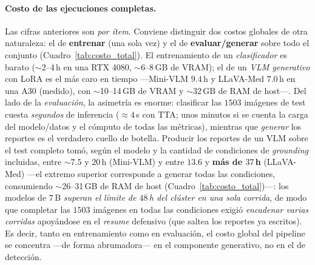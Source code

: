 \documentclass[11pt, a4paper]{article}
\begin{document}
\paragraph{Costo de las ejecuciones completas.} Las cifras anteriores son \emph{por ítem}. Conviene
distinguir dos costos globales de otra naturaleza: el de \textbf{entrenar} (una sola vez) y el de
\textbf{evaluar/generar} sobre todo el conjunto (Cuadro~\ref{tab:costo_total}). El entrenamiento de un
\emph{clasificador} es barato ($\sim$2--4\,h en una RTX 4080, $\sim$6--8\,GB de VRAM); el de un
\emph{VLM generativo} con LoRA es el más caro en tiempo —Mini-VLM $9.4$\,h y LLaVA-Med $7.0$\,h en una A30
(medido), con $\sim$10--14\,GB de VRAM y $\sim$32\,GB de RAM de host—. Del lado de la \emph{evaluación}, la
asimetría es enorme: clasificar las $1503$ imágenes de test cuesta \emph{segundos} de inferencia ($\approx
4$\,s con TTA; unos minutos si se cuenta la carga del modelo/datos y el cómputo de todas las métricas),
mientras que \emph{generar} los reportes es el verdadero cuello de botella. Producir los reportes de un VLM
sobre el test completo tomó, según el modelo y la cantidad de condiciones de \emph{grounding} incluidas,
entre $\sim$$7.5$ y $20$\,h (Mini-VLM) y entre $13.6$ y \textbf{más de $37$\,h} (LLaVA-Med) —el extremo
superior corresponde a generar todas las condiciones, consumiendo $\sim$26--31\,GB de
RAM de host (Cuadro~\ref{tab:costo_total})—: los modelos de $7$\,B \emph{superan el límite de $48$\,h del
clúster en una sola corrida}, de modo que completar las $1503$ imágenes en todas las condiciones exigió
\emph{encadenar varias corridas} apoyándose en el \emph{resume} defensivo (que saltea los reportes ya
escritos). Es decir, tanto en entrenamiento como en evaluación, el costo global del pipeline se concentra
—de forma abrumadora— en el componente generativo, no en el de detección.
\end{document}
